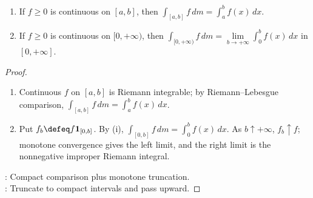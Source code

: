 \begin{corollary} \label{cor:nonnegative-continuous-lebesgue-riemann} 
\begin{enumerate}[label=(\roman*)]
\setlength{\itemsep}{0pt}
\item If $f\geq0$ is continuous on $[a,b]$, then $\int_{[a,b]}f\,dm=\int_a^bf(x)\,dx$.
\item If $f\geq0$ is continuous on $[0,+\infty)$, then $\int_{[0,+\infty)}f\,dm=\lim\limits_{b\to+\infty}\int_0^bf(x)\,dx$ in $[0,+\infty]$.
\end{enumerate}
\begin{proof}
\begin{enumerate}[label=(\roman*)]
\setlength{\itemsep}{0pt}
\item Continuous $f$ on $[a,b]$ is Riemann integrable; by Riemann--Lebesgue comparison, $\int_{[a,b]}f\,dm=\int_a^bf(x)\,dx$.
\item Put $f_b\defeq f\mathbf{1}_{[0,b]}$. By (i), $\int_{[0,b]}f\,dm=\int_0^bf(x)\,dx$. As $b\uparrow+\infty$, $f_b\uparrow f$; monotone convergence gives the left limit, and the right limit is the nonnegative improper Riemann integral.
\end{enumerate}
: Compact comparison plus monotone truncation.\\
: Truncate to compact intervals and pass upward.
\end{proof}
\end{corollary}

